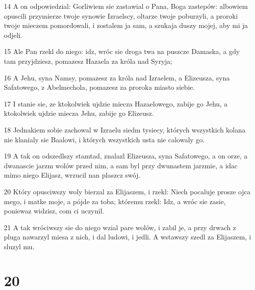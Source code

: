 \par 14 A on odpowiedzial: Gorliwiem sie zastawial o Pana, Boga zastepów: albowiem opuscili przymierze twoje synowie Izraelscy, oltarze twoje poburzyli, a proroki twoje mieczem pomordowali, i zostalem ja sam, a szukaja duszy mojej, aby mi ja odjeli.
\par 15 Ale Pan rzekl do niego: idz, wróc sie droga twa na puszcze Damaska, a gdy tam przyjdziesz, pomazesz Hazaela za króla nad Syryja;
\par 16 A Jehu, syna Namsy, pomazesz za króla nad Izraelem, a Elizeusza, syna Safatowego, z Abelmechola, pomazesz za proroka miasto siebie.
\par 17 I stanie sie, ze ktokolwiek ujdzie miecza Hazaelowego, zabije go Jehu, a ktokolwiek ujdzie miecza Jehu, zabije go Elizeusz.
\par 18 Jednakiem sobie zachowal w Izraelu siedm tysiecy, których wszystkich kolana nie klanialy sie Baalowi, i których wszystkich usta nie calowaly go.
\par 19 A tak on odszedlszy stamtad, znalazl Elizeusza, syna Safatowego, a on orze, a dwanascie jarzm wolów przed nim, a sam byl przy dwunastem jarzmie, a idac mimo niego Elijasz, wrzucil nan plaszcz swój.
\par 20 Który opusciwszy woly bierzal za Elijaszem, i rzekl: Niech pocaluje prosze ojca mego, i matke moje, a pójde za toba; któremu rzekl: Idz, a wróc sie zasie, poniewaz widzisz, com ci uczynil.
\par 21 A tak wróciwszy sie do niego wzial pare wolów, i zabil je, a przy drwach z pluga nawarzyl miesa z nich, i dal ludowi, i jedli. A wstawszy szedl za Elijaszem, i sluzyl mu.

\chapter{20}

